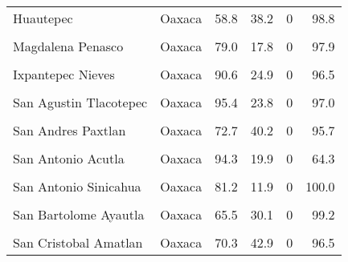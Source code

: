 \documentclass[
]{report}
\begin{document}
\begin{longtable}[t]{llrrrr}
\addlinespace
Huautepec & Oaxaca & 58.8 & 38.2 & 0 & 98.8\\
\cellcolor{gray!6}{Santa Magdalena Jicotlan} & \cellcolor{gray!6}{Oaxaca} & \cellcolor{gray!6}{100.0} & \cellcolor{gray!6}{14.1} & \cellcolor{gray!6}{0} & \cellcolor{gray!6}{73.9}\\
Magdalena Penasco & Oaxaca & 79.0 & 17.8 & 0 & 97.9\\
\cellcolor{gray!6}{Magdalena Teitipac} & \cellcolor{gray!6}{Oaxaca} & \cellcolor{gray!6}{72.6} & \cellcolor{gray!6}{44.7} & \cellcolor{gray!6}{0} & \cellcolor{gray!6}{97.6}\\
Ixpantepec Nieves & Oaxaca & 90.6 & 24.9 & 0 & 96.5\\
\addlinespace
\cellcolor{gray!6}{Santa Catarina Quioquitani} & \cellcolor{gray!6}{Oaxaca} & \cellcolor{gray!6}{97.3} & \cellcolor{gray!6}{21.6} & \cellcolor{gray!6}{0} & \cellcolor{gray!6}{99.1}\\
San Agustin Tlacotepec & Oaxaca & 95.4 & 23.8 & 0 & 97.0\\
\cellcolor{gray!6}{San Andres Nuxino} & \cellcolor{gray!6}{Oaxaca} & \cellcolor{gray!6}{98.0} & \cellcolor{gray!6}{18.6} & \cellcolor{gray!6}{0} & \cellcolor{gray!6}{81.0}\\
San Andres Paxtlan & Oaxaca & 72.7 & 40.2 & 0 & 95.7\\
\cellcolor{gray!6}{San Antonino Monte Verde} & \cellcolor{gray!6}{Oaxaca} & \cellcolor{gray!6}{92.9} & \cellcolor{gray!6}{14.7} & \cellcolor{gray!6}{0} & \cellcolor{gray!6}{97.5}\\
\addlinespace
San Antonio Acutla & Oaxaca & 94.3 & 19.9 & 0 & 64.3\\
\cellcolor{gray!6}{San Antonio Huitepec} & \cellcolor{gray!6}{Oaxaca} & \cellcolor{gray!6}{97.7} & \cellcolor{gray!6}{20.6} & \cellcolor{gray!6}{0} & \cellcolor{gray!6}{94.7}\\
San Antonio Sinicahua & Oaxaca & 81.2 & 11.9 & 0 & 100.0\\
\cellcolor{gray!6}{San Antonio Tepetlapa} & \cellcolor{gray!6}{Oaxaca} & \cellcolor{gray!6}{84.0} & \cellcolor{gray!6}{14.1} & \cellcolor{gray!6}{0} & \cellcolor{gray!6}{95.0}\\
San Bartolome Ayautla & Oaxaca & 65.5 & 30.1 & 0 & 99.2\\
\addlinespace
\cellcolor{gray!6}{San Blas Atempa} & \cellcolor{gray!6}{Oaxaca} & \cellcolor{gray!6}{68.9} & \cellcolor{gray!6}{50.1} & \cellcolor{gray!6}{0} & \cellcolor{gray!6}{85.9}\\
San Cristobal Amatlan & Oaxaca & 70.3 & 42.9 & 0 & 96.5\\

\end{longtable}
\end{document}
